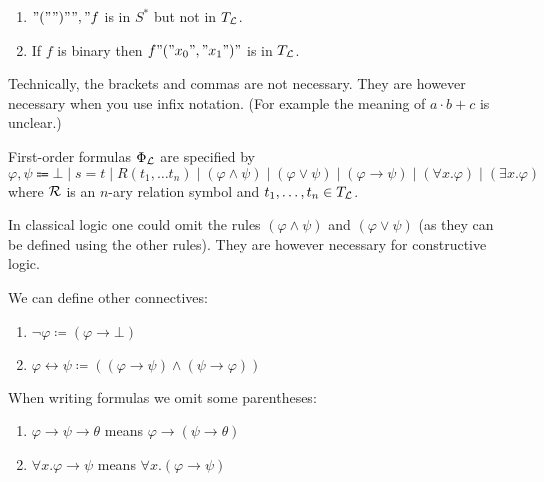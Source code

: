 \begin{example}
    \hfill
    \begin{enumerate}
        \item $"("")"","f$ is in $S^*$ but not in $T_{\mathcal{L}}$. 
        \item If $f$ is binary then $f"("x_0 "," x_1 ")"$ is in $T_{\mathcal{L}}$.
    \end{enumerate}
\end{example}

\begin{rem}
Technically, the brackets and commas are not necessary. 
They are however necessary when you use infix notation. 
(For example the meaning of $a \cdot b + c$ is unclear.)
\end{rem}

\begin{defi}
First-order \alert{formulas $\Phi_{\mathcal{L}}$} are specified by
\begin{equation*}
    \varphi, \psi \Coloneqq \bot \mid s = t \mid R(t_1, \dots t_n) \mid (\varphi \wedge \psi) \mid (\varphi \lor \psi) \mid (\varphi \to \psi) \mid (\forall x. \varphi) \mid (\exists x. \varphi)
\end{equation*}
where $\mathcal{R}$ is an $n$-ary relation symbol and $t_1, \dots, t_n \in T_{\mathcal{L}}$.
\end{defi}

\begin{rem}
In classical logic one could omit the rules $(\varphi \wedge \psi)$ and $(\varphi \lor \psi)$ (as they can be defined using the other rules). 
They are however necessary for constructive logic.
\end{rem}

\begin{rem}
We can define other connectives: 
\begin{enumerate}
    \item $\neg \varphi \coloneq (\varphi \to \bot)$
    \item $\varphi \leftrightarrow \psi \coloneq ((\varphi \to \psi) \wedge (\psi \to \varphi))$
\end{enumerate}
\end{rem}

\begin{rem}
When writing formulas we omit some parentheses: 
\begin{enumerate}
    \item $\varphi \to \psi \to \theta$ means $\varphi \to (\psi \to \theta)$
    \item $\forall x. \varphi \to \psi$ means $\forall x. (\varphi \to \psi)$
\end{enumerate}
\end{rem}


